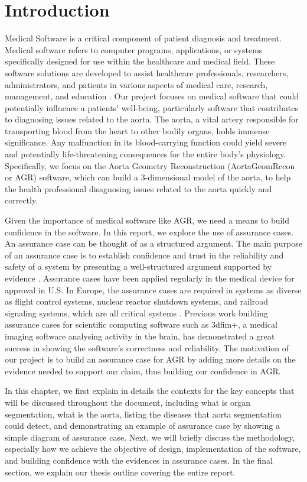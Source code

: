 \chapter{Introduction} \label{intro}

Medical Software is a critical component of patient diagnosis and treatment. Medical software refers to computer programs, applications, or systems specifically designed for use within the healthcare and medical field. These software solutions are developed to assist healthcare professionals, researchers, administrators, and patients in various aspects of medical care, research, management, and education \cite{medical_software}. Our project focuses on medical software that could potentially influence a patients' well-being, particularly software that contributes to diagnosing issues related to the aorta. The aorta, a vital artery responsible for transporting blood from the heart to other bodily organs, holds immense significance. Any malfunction in its blood-carrying function could yield severe and potentially life-threatening consequences for the entire body's physiology. Specifically, we focus on the Aorta Geometry Reconstruction (AortaGeomRecon or AGR) software, which can build a 3-dimensional model of the aorta, to help the health professional disagnosing issues related to the aorta quickly and correctly.

Given the importance of medical software like AGR, we need a means to build confidence in the software. In this report, we explore the use of assurance cases. An assurance case can be thought of as a structured argument. The main purpose of an assurance case is to establish confidence and trust in the reliability and safety of a system by presenting a well-structured argument supported by evidence \cite{Weinstock_2013}. Assurance cases have been applied regularly in the medical device for approval in U.S. In Europe, the assurance cases are required in systems as diverse as flight control systems, nuclear reactor shutdown systems, and railroad signaling systems, which are all critical systems \cite{Weinstock_2013}. Previous work \cite{scs_ac} building assurance cases for scientific computing software such as 3dfim+, a medical imaging software analysing activity in the brain, has demonstrated a great success in showing the software's correctness and reliability. The motivation of our project is to build an assurance case for AGR by adding more details on the evidence needed to support our claim, thus building our confidence in AGR.

In this chapter, we first explain in details the contexts for the key concepts that will be discussed throughout the document, including what is organ segmentation, what is the aorta, listing the diseases that aorta segmentation could detect, and demonstrating an example of assurance case by showing a simple diagram of assurance case. Next, we will briefly discuss the methodology, especially how we achieve the objective of design, implementation of the software, and building confidence with the evidences in assurance cases. In the final section, we explain our thesis outline covering the entire report.

